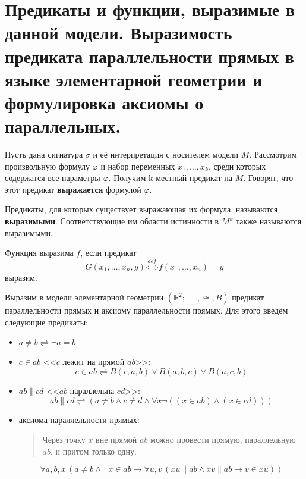 \section{Предикаты и функции, выразимые в данной модели. Выразимость предиката параллельности прямых в языке
элементарной геометрии и формулировка аксиомы о параллельных.}
\begin{definition}
	Пусть дана сигнатура $\sigma$ и её интерпретация с носителем модели $M$. Рассмотрим произвольную формулу
	$\varphi$ и набор переменных $x_1,\ldots,x_k$, среди которых содержатся все параметры $\varphi$. Получим k-местный
	предикат на $M$. Говорят, что этот предикат \textbf{выражается} формулой $\varphi$.

	Предикаты, для которых существует выражающая их формула, называются \textbf{выразимыми}. Соответствующие им
	области истинности в $M^k$ также называются выразимыми.
\end{definition}
\begin{definition}
	Функция выразима $f$, если предикат $$G(x_1,\ldots,x_n,y) \stackrel{def}{\Longleftrightarrow} f(x_1,\ldots,x_n)
	= y$$ выразим.
\end{definition}
\begin{example}
	Выразим в модели элементарной геометрии $(\mathbb{R}^2;=,\cong,B)$ предикат параллельности прямых и аксиому
	параллельности прямых. Для этого введём следующие предикаты:
	\begin{itemize}
		\item $a \ne b \rightleftharpoons \neg a=b$
		\item $c \in ab$ <<$c$ лежит на прямой $ab$>>: $$c\in ab \rightleftharpoons B(c,a,b)\vee B(a,b,c)\vee
			B(a,c,b)$$
		\item $ab\parallel cd$ <<$ab$ параллельна $cd$>>: $$ab\parallel cd\rightleftharpoons (a \ne b\wedge c \ne
			d\wedge \forall x\neg ((x\in ab)\wedge (x\in cd)))$$
		\item аксиома параллельности прямых:
			\begin{quote}
				Через точку $x$ вне прямой $ab$ можно провести прямую, параллельную $ab$, и притом только одну.
			\end{quote}
			$$\forall a,b,x\,(a\ne b \wedge\neg x\in ab \to \forall u,v\,(xu\parallel ab \wedge xv\parallel ab\to
			v\in xu))$$
	\end{itemize}
\end{example}
